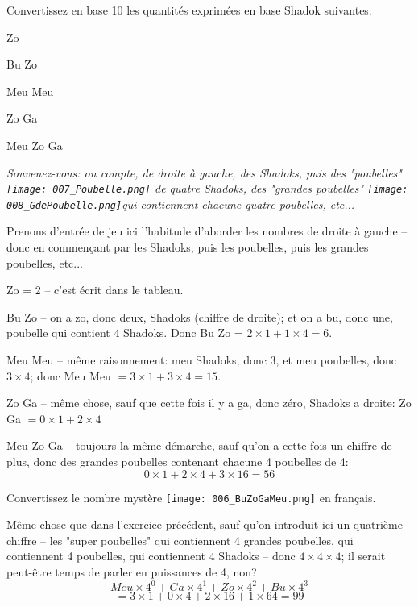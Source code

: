 \documentclass[12pt]{article}
\begin{document}
	\begin{MonExo}
		Convertissez en base 10 les quantités exprimées en base Shadok suivantes:
		\begin{alphenum}
			\item Zo
			\item Bu Zo
			\item Meu Meu
			\item Zo Ga
			\item Meu Zo Ga
		\end{alphenum}
		\textit{Souvenez-vous: on compte, de droite à gauche, des Shadoks, puis des "poubelles" \texttt{[image: 007\_Poubelle.png]} de quatre Shadoks, des "grandes poubelles" \texttt{[image: 008\_GdePoubelle.png]}qui contiennent chacune quatre poubelles, etc... }
	\end{MonExo}
	
	\begin{MaReponse}
		Prenons d'entrée de jeu ici l'habitude d'aborder les nombres de droite à gauche -- donc en commençant par les Shadoks, puis les poubelles, puis les grandes poubelles, etc...
		\begin{alphenum}
			\item Zo = 2 -- c'est écrit dans le tableau.
			\item Bu Zo -- on a zo, donc deux, Shadoks (chiffre de droite); et on a bu, donc une, poubelle qui contient 4 Shadoks. Donc Bu Zo = $2\times1 + 1\times4 = 6$.
			\item Meu Meu -- même raisonnement: meu Shadoks, donc 3, et meu poubelles, donc $3\times4$; donc Meu Meu $= 3\times1 + 3\times4 = 15$.
			\item Zo Ga -- même chose, sauf que cette fois il y a ga, donc zéro, Shadoks a droite: Zo Ga $= 0\times1 + 2\times4$
			\item Meu Zo Ga -- toujours la même démarche, sauf qu'on a cette fois un chiffre de plus, donc des grandes poubelles contenant chacune 4 poubelles de 4:  \[ 0 \times 1 + 2 \times 4 + 3 \times 16 = 56 \]
		\end{alphenum}
	\end{MaReponse}
	
	\begin{MonExo}
		Convertissez le nombre mystère \texttt{[image: 006\_BuZoGaMeu.png]} en français.
	\end{MonExo}
	
	\begin{MaReponse}
		Même chose que dans l'exercice précédent, sauf qu'on introduit ici un quatrième chiffre -- les "super poubelles" qui contiennent 4 grandes poubelles, qui contiennent 4 poubelles, qui contiennent 4 Shadoks -- donc $4\times4\times4$; il serait peut-être temps de parler en puissances de 4, non?
		\[ Meu \times 4^0 + Ga \times 4^1 + Zo \times 4^2 + Bu \times 4^3\] 
		\[= 3 \times 1 + 0 \times 4 + 2 \times 16 + 1 \times 64 = 99\]
	\end{MaReponse}
	
\end{document}
